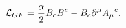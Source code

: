 \begin{equation}
{\cal{L}}_{GF} = \frac{\alpha}{2} B_c B^c - B_c \partial^\mu {A_\mu}^c.
\end{equation}


